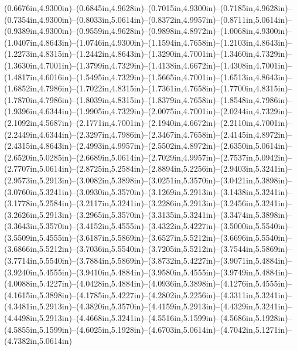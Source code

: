 (0.6676in,4.9300in)--(0.6845in,4.9628in)--(0.7015in,4.9300in)--(0.7185in,4.9628in)--(0.7354in,4.9300in)--(0.8033in,5.0614in)--(0.8372in,4.9957in)--(0.8711in,5.0614in)--(0.9389in,4.9300in)--(0.9559in,4.9628in)--(0.9898in,4.8972in)--(1.0068in,4.9300in)--(1.0407in,4.8643in)--(1.0746in,4.9300in)--(1.1594in,4.7658in)--(1.2103in,4.8643in)--(1.2273in,4.8315in)--(1.2442in,4.8643in)--(1.3290in,4.7001in)--(1.3460in,4.7329in)--(1.3630in,4.7001in)--(1.3799in,4.7329in)--(1.4138in,4.6672in)--(1.4308in,4.7001in)--(1.4817in,4.6016in)--(1.5495in,4.7329in)--(1.5665in,4.7001in)--(1.6513in,4.8643in)--(1.6852in,4.7986in)--(1.7022in,4.8315in)--(1.7361in,4.7658in)--(1.7700in,4.8315in)--(1.7870in,4.7986in)--(1.8039in,4.8315in)--(1.8379in,4.7658in)--(1.8548in,4.7986in)--(1.9396in,4.6344in)--(1.9905in,4.7329in)--(2.0075in,4.7001in)--(2.0244in,4.7329in)--(2.1092in,4.5687in)--(2.1771in,4.7001in)--(2.1940in,4.6672in)--(2.2110in,4.7001in)--(2.2449in,4.6344in)--(2.3297in,4.7986in)--(2.3467in,4.7658in)--(2.4145in,4.8972in)--(2.4315in,4.8643in)--(2.4993in,4.9957in)--(2.5502in,4.8972in)--(2.6350in,5.0614in)--(2.6520in,5.0285in)--(2.6689in,5.0614in)--(2.7029in,4.9957in)--(2.7537in,5.0942in)--(2.7707in,5.0614in)--(2.8725in,5.2584in)--(2.8894in,5.2256in)--(2.9403in,5.3241in)--(2.9573in,5.2913in)--(3.0082in,5.3898in)--(3.0251in,5.3570in)--(3.0421in,5.3898in)--(3.0760in,5.3241in)--(3.0930in,5.3570in)--(3.1269in,5.2913in)--(3.1438in,5.3241in)--(3.1778in,5.2584in)--(3.2117in,5.3241in)--(3.2286in,5.2913in)--(3.2456in,5.3241in)--(3.2626in,5.2913in)--(3.2965in,5.3570in)--(3.3135in,5.3241in)--(3.3474in,5.3898in)--(3.3643in,5.3570in)--(3.4152in,5.4555in)--(3.4322in,5.4227in)--(3.5000in,5.5540in)--(3.5509in,5.4555in)--(3.6187in,5.5869in)--(3.6527in,5.5212in)--(3.6696in,5.5540in)--(3.6866in,5.5212in)--(3.7036in,5.5540in)--(3.7205in,5.5212in)--(3.7544in,5.5869in)--(3.7714in,5.5540in)--(3.7884in,5.5869in)--(3.8732in,5.4227in)--(3.9071in,5.4884in)--(3.9240in,5.4555in)--(3.9410in,5.4884in)--(3.9580in,5.4555in)--(3.9749in,5.4884in)--(4.0088in,5.4227in)--(4.0428in,5.4884in)--(4.0936in,5.3898in)--(4.1276in,5.4555in)--(4.1615in,5.3898in)--(4.1785in,5.4227in)--(4.2802in,5.2256in)--(4.3311in,5.3241in)--(4.3481in,5.2913in)--(4.3820in,5.3570in)--(4.4159in,5.2913in)--(4.4329in,5.3241in)--(4.4498in,5.2913in)--(4.4668in,5.3241in)--(4.5516in,5.1599in)--(4.5686in,5.1928in)--(4.5855in,5.1599in)--(4.6025in,5.1928in)--(4.6703in,5.0614in)--(4.7042in,5.1271in)--(4.7382in,5.0614in)
